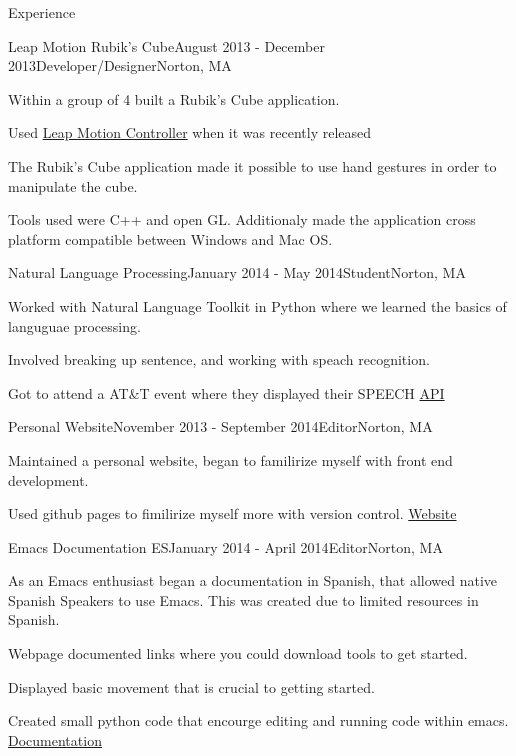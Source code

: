 \documentclass{resume} %
\begin{document}
\begin{rSection}{Experience}

\begin{rSubsection}{Leap Motion Rubik's Cube}{August 2013 - December 2013}{Developer/Designer}{Norton, MA}
\item Within a group of 4 built a Rubik's Cube application.
\item Used \href{https://www.leapmotion.com/}{Leap Motion Controller} when it was recently released
\item The Rubik's Cube application made it possible to use hand gestures in order to  manipulate the cube. 

\item Tools used were C++  and open GL. Additionaly made the application cross platform compatible between Windows and Mac OS.  

\end{rSubsection}


\begin{rSubsection}{Natural Language Processing}{January 2014 - May 2014}{Student}{Norton, MA}
\item Worked with Natural Language Toolkit in Python where we learned the basics of languguae processing.
\item  Involved breaking up sentence, and working with speach recognition.
\item Got to attend a AT\&T event where they displayed their SPEECH \href{http://www.research.att.com/projects/WATSON/}{API}


\end{rSubsection}
\begin{rSubsection}{Personal Website}{November 2013 - September 2014}{Editor}{Norton, MA}
\item  Maintained a personal website, began to familirize myself with front end development.
\item  Used github pages to fimilirize myself more with version control. \href{http://guti15.github.io/}{Website}


\end{rSubsection}


\begin{rSubsection}{Emacs Documentation ES}{January 2014 - April 2014}{Editor}{Norton, MA}
\item As an Emacs enthusiast began a documentation in Spanish, that allowed native Spanish Speakers to use Emacs.  This was created due to limited resources in Spanish. 
\item Webpage documented links where you could download tools to get started.
\item Displayed basic movement that is crucial to getting started.  
\item Created small python code that encourge editing and running code within emacs. \href{http://guti15.github.io/Emacs_Documentation_es/Intro.html}{Documentation}


\end{rSubsection}
\end{rSection}
\end{document}

